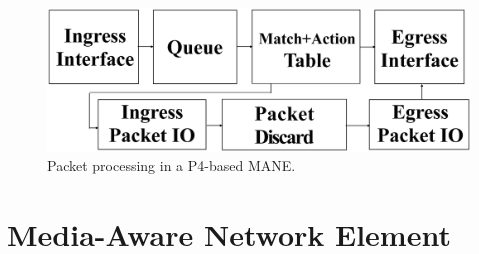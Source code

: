 \begin{figure}[tbh]
		\centering
		\includegraphics[width=.24\textwidth]{fig/MANE_1.eps}
		\caption{Packet processing in a P4-based MANE.}
		\label{MANE}
\end{figure}

\section{Media-Aware Network Element} \label{sec:mane}

